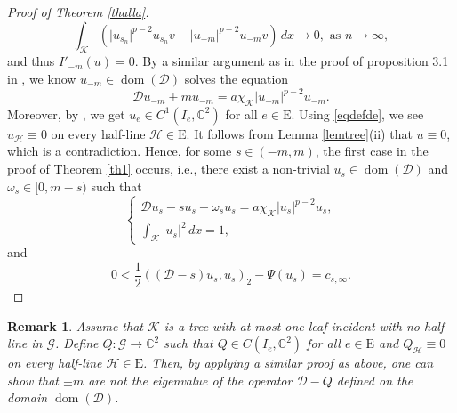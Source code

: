 \documentclass[11pt]{amsart}
\newtheorem{remark}[theorem]{Remark}
\newcommand{\abs}[1]{\lvert#1\rvert}
\newcommand{\D}{\mathcal{D}}
\newcommand{\G}{\mathcal{G}}
\newcommand{\K}{\mathcal{K}}
\numberwithin{equation}{section}
\begin{document}
\begin{proof}[Proof of Theorem \ref{thalla}]
\begin{equation}
    \int_{\K} (\abs{u_{s_n}}^{p-2} u_{s_n}v-\abs{u_{-m}}^{p-2} u_{-m}v) \, dx \to 0,\,\,\text{as}\,\, n \rightarrow \infty,
\end{equation}
and thus $I'_{-m}(u)=0$. By a similar argument as in  the
proof of proposition 3.1 in \cite{Bo}, we know $u_{-m}\in \operatorname{dom}(\D)$ solves the equation
\[
\D u_{-m}+mu_{-m}=a\chi_{\K}\abs{u_{-m}}^{p-2} u_{-m}.
\]
Moreover, by \cite[Remark 6 in Chapter 8]{Ha}, we get $u_e\in C^1(I_e,\mathbb{C}^2)$ for all $e \in \mathrm{E}$.
Using \eqref{eqdefde}, we see $u_{\mathcal{H}} \equiv 0$ on every half-line $\mathcal{H}\in\mathrm{E}$. It follows from Lemma \ref{lemtree}(ii) that $u\equiv 0$, which is a contradiction. Hence, for some $s \in (-m,m)$, the first case in the proof of Theorem \ref{th1} occurs, i.e., there exist a non-trivial $u_{s} \in \operatorname{dom}(\D)$ and $\omega_{s} \in[0, m-s)$ such that
$$
\left\{\begin{array}{l}
\D u_s-su_{s}-\omega_{s} u_{s}=a\chi_{\K}\abs{u_{s}}^{p-2} u_{s}, \\
\int_{\K}\abs{u_{s}}^{2} \,dx=1,
\end{array}\right.
$$
and
$$
0<\frac{1}{2}((\D-s) u_{s}, u_{s})_{2}-\Psi(u_{s}) = c_{s,\infty}.
$$
\end{proof}
\begin{remark}
Assume that $\K$ is a tree with at most one leaf incident with no half-line in $\G$. Define $Q:\G \to \mathbb{C}^2$ such that $Q\in C(I_e,\mathbb{C}^2)$ for all $e\in\mathrm{E}$ and $Q_{\mathcal{H}} \equiv 0$ on every half-line $\mathcal{H}\in\mathrm{E}$. Then, by applying a similar proof as above, one can show that $\pm m$ are not the eigenvalue of the operator $\D-Q$ defined on the domain $\operatorname{dom}(\D)$.
\end{remark}
\end{document}
